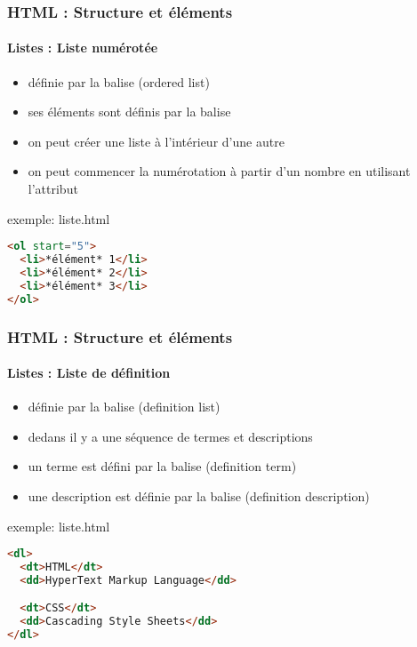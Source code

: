 \documentclass[xcolor=table]{beamer}
\begin{document}
\begin{frame}[fragile]
\frametitle{HTML : Structure et éléments}
\framesubtitle{Listes : Liste numérotée}

\begin{minipage}{0.60\textwidth} 
	\begin{itemize}
		\item définie par la balise  (ordered list)
		\item ses éléments sont définis par la balise 
		\item on peut créer une liste à l'intérieur d'une autre
		\item on peut commencer la numérotation à partir d'un nombre en utilisant l'attribut 
	\end{itemize}
\end{minipage}
%
\begin{minipage}{0.38\textwidth}
\begin{exampleblock}{exemple: liste.html}
\lstset{escapeinside=**}
\scriptsize\bfseries
\begin{lstlisting}[language={html}]
<ol start="5">
  <li>*élément* 1</li>
  <li>*élément* 2</li>
  <li>*élément* 3</li>
</ol>
\end{lstlisting}
\end{exampleblock}
\end{minipage}

\end{frame}

\begin{frame}[fragile]
\frametitle{HTML : Structure et éléments}
\framesubtitle{Listes : Liste de définition}

\begin{minipage}{0.50\textwidth} 
	\begin{itemize}
		\item définie par la balise  (definition list)
		\item dedans il y a une séquence de termes et descriptions
		\item un terme est défini par la balise  (definition term)
		\item une description est définie par la balise  (definition description)
	\end{itemize}
\end{minipage}
%
\begin{minipage}{0.49\textwidth}
\begin{exampleblock}{exemple: liste.html}
\lstset{escapeinside=**}
\scriptsize\bfseries
\begin{lstlisting}[language={html}]
<dl>
  <dt>HTML</dt>
  <dd>HyperText Markup Language</dd>

  <dt>CSS</dt>
  <dd>Cascading Style Sheets</dd>
</dl>
\end{lstlisting}
\end{exampleblock}
\end{minipage}

\end{frame}
\end{document}
